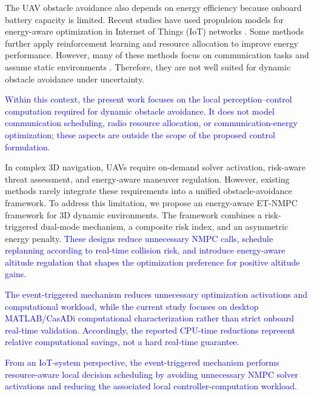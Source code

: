\documentclass[lettersize,journal]{IEEEtran}
\begin{document}
The UAV obstacle avoidance also depends on energy efficiency because onboard battery capacity is limited. Recent studies have used propulsion models \cite{ref26, ref27, ref28} for energy-aware optimization in Internet of Things (IoT) networks \cite{ref29, ref30}. Some methods further apply reinforcement learning \cite{ref31} and resource allocation \cite{ref32} to improve energy performance. However, many of these methods focus on communication tasks and assume static environments \cite{ref33}. Therefore, they are not well suited for dynamic obstacle avoidance under uncertainty.

\textcolor{blue}{Within this context, the present work focuses on the local perception--control computation required for dynamic obstacle avoidance. It does not model communication scheduling, radio resource allocation, or communication-energy optimization; these aspects are outside the scope of the proposed control formulation.}

In complex 3D navigation, UAVs require on-demand solver activation, risk-aware threat assessment, and energy-aware maneuver regulation. However, existing methods rarely integrate these requirements into a unified obstacle-avoidance framework. To address this limitation, we propose an energy-aware ET-NMPC framework for 3D dynamic environments. The framework combines a risk-triggered dual-mode mechanism, a composite risk index, and an asymmetric energy penalty. \textcolor{blue}{These designs reduce unnecessary NMPC calls, schedule replanning according to real-time collision risk, and introduce energy-aware altitude regulation that shapes the optimization preference for positive altitude gains.}

\textcolor{blue}{The event-triggered mechanism reduces unnecessary optimization activations and computational workload, while the current study focuses on desktop MATLAB/CasADi computational characterization rather than strict onboard real-time validation. Accordingly, the reported CPU-time reductions represent relative computational savings, not a hard real-time guarantee.}

\textcolor{blue}{From an IoT-system perspective, the event-triggered mechanism performs resource-aware local decision scheduling by avoiding unnecessary NMPC solver activations and reducing the associated local controller-computation workload.}
\end{document}
